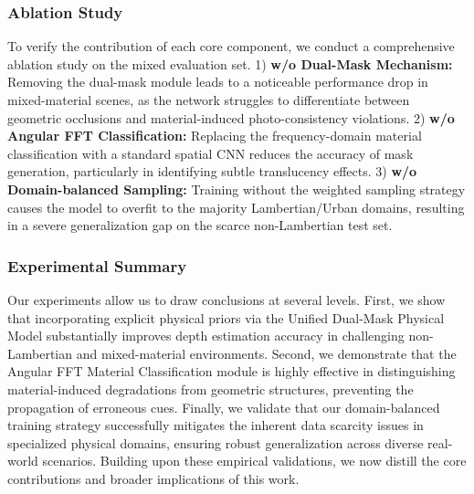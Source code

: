 \subsubsection{Ablation Study}

To verify the contribution of each core component, we conduct a comprehensive ablation study on the mixed evaluation set. 
1) \textbf{w/o Dual-Mask Mechanism:} Removing the dual-mask module leads to a noticeable performance drop in mixed-material scenes, as the network struggles to differentiate between geometric occlusions and material-induced photo-consistency violations.
2) \textbf{w/o Angular FFT Classification:} Replacing the frequency-domain material classification with a standard spatial CNN reduces the accuracy of mask generation, particularly in identifying subtle translucency effects.
3) \textbf{w/o Domain-balanced Sampling:} Training without the weighted sampling strategy causes the model to overfit to the majority Lambertian/Urban domains, resulting in a severe generalization gap on the scarce non-Lambertian test set. 

\subsubsection{Experimental Summary}

Our experiments allow us to draw conclusions at several levels. First, we show that incorporating explicit physical priors via the Unified Dual-Mask Physical Model substantially improves depth estimation accuracy in challenging non-Lambertian and mixed-material environments. Second, we demonstrate that the Angular FFT Material Classification module is highly effective in distinguishing material-induced degradations from geometric structures, preventing the propagation of erroneous cues. Finally, we validate that our domain-balanced training strategy successfully mitigates the inherent data scarcity issues in specialized physical domains, ensuring robust generalization across diverse real-world scenarios. Building upon these empirical validations, we now distill the core contributions and broader implications of this work.